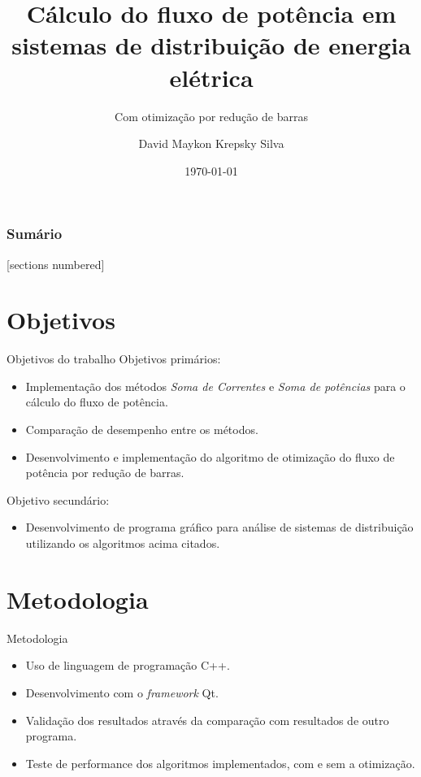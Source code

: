 \documentclass[10pt]{beamer}
\title{Cálculo do fluxo de potência em sistemas de distribuição de energia elétrica}
\subtitle{Com otimização por redução de barras}
\date{\today}
\author{David Maykon Krepsky Silva}
\institute{Departamento de Engenharia Elétrica}
\begin{document}
\maketitle

\begin{frame}
  \frametitle{Sumário}
  [sections numbered]
  \tableofcontents[hideallsubsections]
\end{frame}

\section{Objetivos}
\begin{frame}{Objetivos do trabalho}
    Objetivos primários:
    \begin{itemize}
        \item Implementação dos métodos \textit{Soma de Correntes} e \textit{Soma de potências} para o cálculo do fluxo de potência.
        
        \item Comparação de desempenho entre os métodos.
        
        \item Desenvolvimento e implementação do algoritmo de otimização do fluxo de potência por redução de barras.
    \end{itemize}
    
    Objetivo secundário:
    \begin{itemize}
        \item Desenvolvimento de programa gráfico para análise de sistemas de distribuição utilizando os algoritmos acima citados.
    \end{itemize}
\end{frame}

\section{Metodologia}

\begin{frame}{Metodologia}
    
    \begin{itemize}
        \item Uso de linguagem de programação C++.
        
        \item Desenvolvimento com o \textit{framework} Qt.
        
        \item Validação dos resultados através da comparação com resultados de outro programa.
        
        \item Teste de performance dos algoritmos implementados, com e sem a otimização.
    \end{itemize}
\end{frame}
\end{document}
